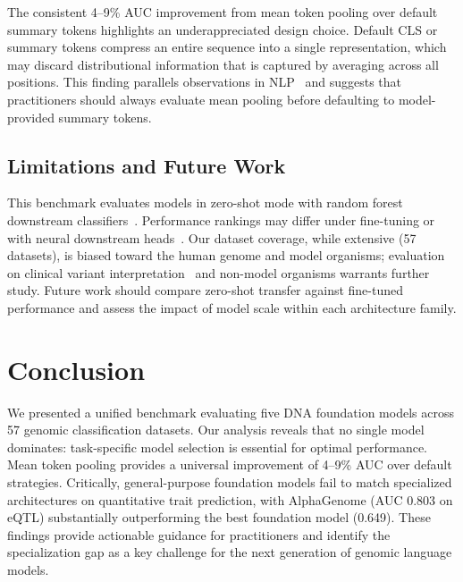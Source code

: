 \documentclass{article}
\begin{document}
The consistent 4--9\% AUC improvement from mean token pooling over default
summary tokens highlights an underappreciated design choice. Default CLS or
summary tokens compress an entire sequence into a single representation, which
may discard distributional information that is captured by averaging across all
positions. This finding parallels observations in NLP~\citep{devlin_2019_bert}
and suggests that practitioners should always evaluate mean pooling before
defaulting to model-provided summary tokens.

\subsection{Limitations and Future Work}

This benchmark evaluates models in zero-shot mode with random forest downstream
classifiers~\citep{breiman_2001_random}. Performance rankings may differ under
fine-tuning or with neural downstream heads~\citep{hastie_2009_elements}. Our dataset coverage, while
extensive (57 datasets), is biased toward the human genome and model organisms;
evaluation on clinical variant interpretation~\citep{landrum_2018_clinvar} and
non-model organisms warrants further study. Future work should compare
zero-shot transfer against fine-tuned performance and assess the impact of
model scale within each architecture family.

\section{Conclusion}
\label{sec:conclusion}

We presented a unified benchmark evaluating five DNA foundation models across 57
genomic classification datasets. Our analysis reveals that no single model
dominates: task-specific model selection is essential for optimal performance.
Mean token pooling provides a universal improvement of 4--9\% AUC over default
strategies. Critically, general-purpose foundation models fail to match
specialized architectures on quantitative trait prediction, with AlphaGenome
(AUC 0.803 on eQTL) substantially outperforming the best foundation model
(0.649). These findings provide actionable guidance for practitioners and
identify the specialization gap as a key challenge for the next generation of
genomic language models.



\end{document}
